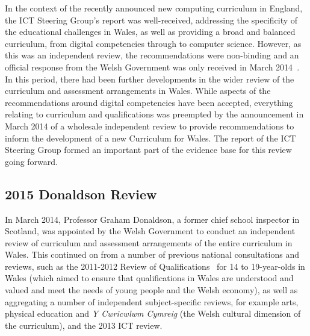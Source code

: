 \documentclass{sig-alternate}
\begin{document}

In the context of the recently announced new computing curriculum in
England, the ICT Steering Group's report was well-received, addressing
the specificity of the educational challenges in Wales, as well as
providing a broad and balanced curriculum, from digital competencies
through to computer science. However, as this was an independent
review, the recommendations were non-binding and an official response
from the Welsh Government was only received in March
2014~\cite{wgictresponse:2014}. In this period, there had been further
developments in the wider review of the curriculum and assessment
arrangements in Wales. While aspects of the recommendations around
digital competencies have been accepted, everything relating to
curriculum and qualifications was preempted by the announcement
in March 2014 of a wholesale independent review to provide
recommendations to inform the development of a new Curriculum for
Wales. The report of the ICT Steering Group formed an important
part of the evidence base for this review going forward.

\subsection{2015 Donaldson Review}

In March 2014, Professor Graham Donaldson, a former chief school
inspector in Scotland, was appointed by the Welsh Government to
conduct an independent review of curriculum and assessment
arrangements of the entire curriculum in Wales.  This continued on
from a number of previous national consultations and reviews, such as
the 2011-2012 Review of Qualifications~\cite{wgrev14-19:2014} for 14
to 19-year-olds in Wales (which aimed to ensure that qualifications in
Wales are understood and valued and meet the needs of young people and
the Welsh economy), as well as aggregating a number of independent
subject-specific reviews, for example arts, physical education and
{\emph{Y Cwricwlwm Cymreig}} (the Welsh cultural dimension of the
curriculum), and the 2013 ICT review.
\end{document}
